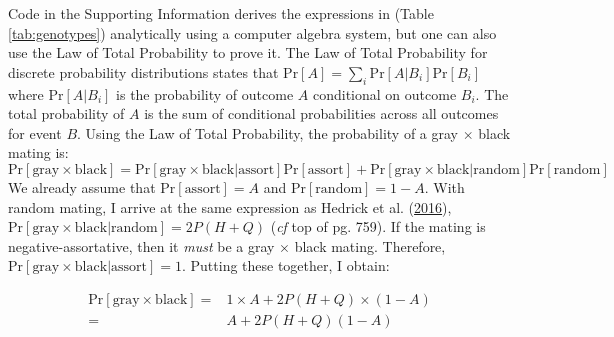 \documentclass[
]{article}
\begin{document}
Code in the Supporting Information derives the expressions in (Table \ref{tab:genotypes}) analytically using a computer algebra system, but one can also use the Law of Total Probability to prove it. The Law of Total Probability for discrete probability distributions states that \(\mathrm{Pr}[A] = \sum_i \mathrm{Pr}[A|B_i] \mathrm{Pr}[B_i]\) where \(\mathrm{Pr}[A|B_i]\) is the probability of outcome \(A\) conditional on outcome \(B_i\). The total probability of \(A\) is the sum of conditional probabilities across all outcomes for event \(B\). Using the Law of Total Probability, the probability of a gray \(\times\) black mating is:
\[\mathrm{Pr}[\textrm{gray} \times \textrm{black}] = \mathrm{Pr}[\textrm{gray} \times \textrm{black}|\textrm{assort}] \mathrm{Pr}[\textrm{assort}] + \mathrm{Pr}[\textrm{gray} \times \textrm{black}|\textrm{random}] \mathrm{Pr}[\textrm{random}]\]
We already assume that \(\mathrm{Pr}[\textrm{assort}] = A\) and \(\mathrm{Pr}[\textrm{random}] = 1 - A\). With random mating, I arrive at the same expression as Hedrick et al. (\protect\hyperlink{ref-hedrick_negative-assortative_2016}{2016}), \(\mathrm{Pr}[\textrm{gray} \times \textrm{black}|\textrm{random}] = 2P(H+Q)\) (\emph{cf} top of pg. 759). If the mating is negative-assortative, then it \emph{must} be a gray \(\times\) black mating. Therefore, \(\mathrm{Pr}[\textrm{gray} \times \textrm{black}|\textrm{assort}] = 1\). Putting these together, I obtain:

\begin{align}
  \mathrm{Pr}[\textrm{gray} \times \textrm{black}] = & 1 \times A + 2P(H+Q) \times (1-A) \nonumber \\
  = & A + 2 P (H + Q) (1 - A) \label{eq1}
\end{align}
\end{document}
